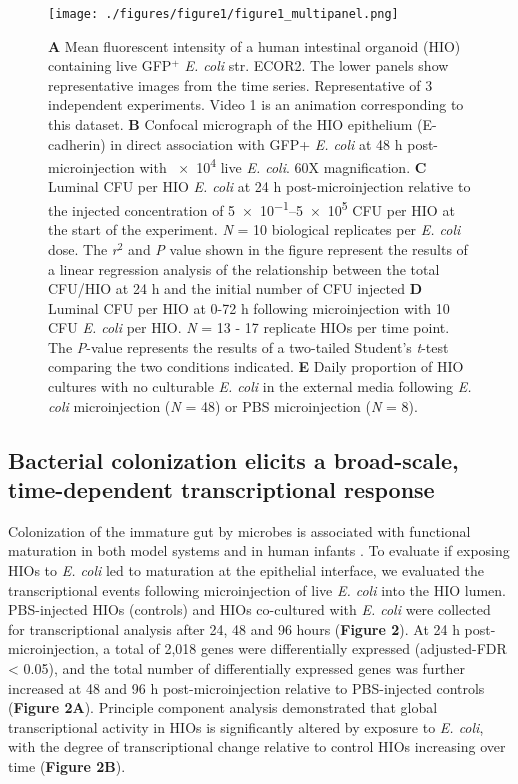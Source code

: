 \documentclass[9pt,lineo]{elife}
\begin{document}
\begin{figure}
\begin{fullwidth}
\texttt{[image: ./figures/figure1/figure1\_multipanel.png]}
\caption{\textbf{A} Mean fluorescent intensity of a human intestinal organoid (HIO) containing live GFP$^{+}$ \textit{E. coli} str. ECOR2.  The lower panels show representative images from the time series. Representative of 3 independent experiments. Video 1 is an animation corresponding to this dataset. \textbf{B} Confocal micrograph of the HIO epithelium (E-cadherin) in direct association with GFP+ \textit{E. coli} at 48 h post-microinjection with \num{e4} live \textit{E. coli}. 60X magnification. \textbf{C} Luminal CFU per HIO \textit{E. coli} at 24 h post-microinjection relative to the injected concentration of \numrange{5e-1}{5e5} CFU per HIO at the start of the experiment. \textit{N} = 10 biological replicates per \textit{E. coli} dose. The \textit{r}$^{2}$ and \textit{P} value shown in the figure represent the results of a linear regression analysis of the relationship between the total CFU/HIO at 24 h and the initial number of CFU injected \textbf{D} Luminal CFU per HIO at 0-72 h following microinjection with 10 CFU \textit{E. coli} per HIO. \textit{N} = 13 - 17 replicate HIOs per time point. The \textit{P}-value represents the results of a two-tailed Student's \textit{t}-test comparing the two conditions indicated. \textbf{E} Daily proportion of HIO cultures with no culturable \textit{E. coli} in the external media following \textit{E. coli} microinjection (\textit{N} = 48) or PBS microinjection (\textit{N} = 8).}
\label{fig:fullwidth}
\end{fullwidth}
\end{figure}

\subsection*{{\bfseries\sffamily } Bacterial colonization elicits a broad-scale, time-dependent transcriptional response}
\label{sec:orgheadline4}
Colonization of the immature gut by microbes is associated with functional maturation in both model systems\citep{Kremer:2013,Sommer:2015,Broderick:2014,Erkosar:2015} and in human infants \citep{Renz:2012}. To evaluate if exposing HIOs to \emph{E. coli} led to maturation at the epithelial interface, we evaluated the transcriptional events following microinjection of live \emph{E. coli}  into the HIO lumen. PBS-injected HIOs (controls) and HIOs co-cultured with \emph{E. coli} were collected for transcriptional analysis after 24, 48 and 96 hours (\textbf{Figure 2}). At 24 h post-microinjection, a total of 2,018 genes were differentially expressed (adjusted-FDR < 0.05), and the total number of differentially expressed genes was further increased at 48 and 96 h post-microinjection relative to PBS-injected controls (\textbf{Figure 2A}). Principle component analysis demonstrated that global transcriptional activity in HIOs is significantly altered by exposure to \emph{E. coli}, with the degree of transcriptional change relative to control HIOs increasing over time (\textbf{Figure 2B}).
\end{document}
